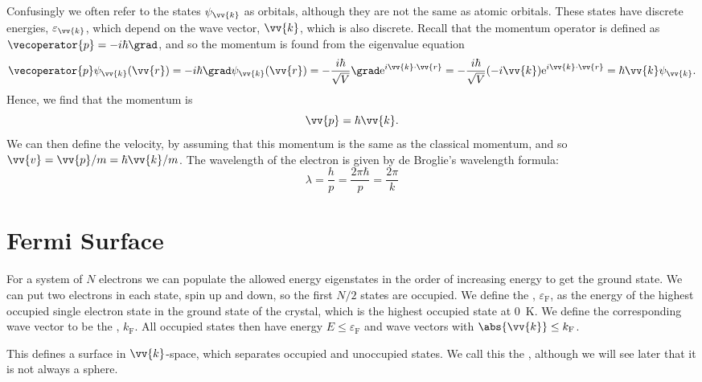 \documentclass[fleqn]{NotesClass}
\newcommand*{\e}{\mathrm{e}}
\newcommand*{\fermi}{\mathrm{F}}
\begin{document}
    Confusingly we often refer to the states \(\psi_{\vv{k}}\) as orbitals, although they are not the same as atomic orbitals.
    These states have discrete energies, \(\varepsilon_{\vv{k}}\), which depend on the wave vector, \(\vv{k}\), which is also discrete.
    Recall that the momentum operator is defined as \(\vecoperator{p} = -i\hbar\grad\), and so the momentum is found from the eigenvalue equation
    \begin{equation}
        \vecoperator{p}\psi_{\vv{k}}(\vv{r}) = -i\hbar\grad\psi_{\vv{k}}(\vv{r}) = -\frac{i\hbar}{\sqrt{V}}\grad\e^{i\vv{k}\cdot\vv{r}} = -\frac{i\hbar}{\sqrt{V}}(-i\vv{k})\e^{i\vv{k}\cdot\vv{r}} = \hbar\vv{k}\psi_{\vv{k}}.
    \end{equation}
    Hence, we find that the momentum is
    \begin{equation}
        \vv{p} = \hbar\vv{k}.
    \end{equation}
    We can then define the velocity, by assuming that this momentum is the same as the classical momentum, and so \(\vv{v} = \vv{p}/m = \hbar\vv{k}/m\).
    The wavelength of the electron is given by de Broglie's wavelength formula:
    \begin{equation}
        \lambda = \frac{h}{p} = \frac{2\pi\hbar}{p} = \frac{2\pi}{k}
    \end{equation}
    
    \section{Fermi Surface}
    For a system of \(N\) electrons we can populate the allowed energy eigenstates in the order of increasing energy to get the ground state.
    We can put two electrons in each state, spin up and down, so the first \(N/2\) states are occupied.
    We define the , \(\varepsilon_{\fermi}\), as the energy of the highest occupied single electron state in the ground state of the crystal, which is the highest occupied state at \qty{0}{\kelvin}.
    We define the corresponding wave vector to be the , \(k_{\fermi}\).
    All occupied states then have energy \(E \le \varepsilon_{\fermi}\) and wave vectors with \(\abs{\vv{k}} \le k_{\fermi}\).
    
    This defines a surface in \(\vv{k}\)-space, which separates occupied and unoccupied states.
    We call this the , although we will see later that it is not always a sphere.
    
\end{document}

